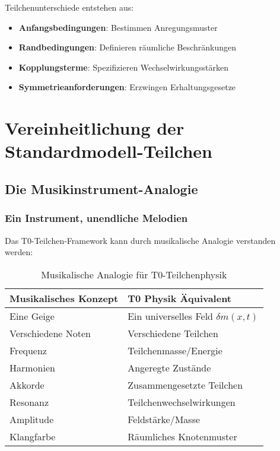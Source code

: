 \documentclass[12pt,a4paper]{article}
\newcommand{\deltafield}{\ensuremath{\delta m}}
\begin{document}
	Teilchenunterschiede entstehen aus:
	\begin{itemize}
		\item \textbf{Anfangsbedingungen}: Bestimmen Anregungsmuster
		\item \textbf{Randbedingungen}: Definieren räumliche Beschränkungen  
		\item \textbf{Kopplungsterme}: Spezifizieren Wechselwirkungsstärken
		\item \textbf{Symmetrieanforderungen}: Erzwingen Erhaltungsgesetze
	\end{itemize}
	
	\section{Vereinheitlichung der Standardmodell-Teilchen}
	\label{sec:sm_vereinheitlichung}
	
	\subsection{Die Musikinstrument-Analogie}
	\label{subsec:musikinstrument_analogie}
	
	\subsubsection{Ein Instrument, unendliche Melodien}
	\label{subsubsec:ein_instrument}
	
	Das T0-Teilchen-Framework kann durch musikalische Analogie verstanden werden:
	
	\begin{table}[htbp]
		\centering
		\begin{tabular}{ll}
			\toprule
			\textbf{Musikalisches Konzept} & \textbf{T0 Physik Äquivalent} \\
			\midrule
			Eine Geige & Ein universelles Feld $\deltafield(x,t)$ \\
			Verschiedene Noten & Verschiedene Teilchen \\
			Frequenz & Teilchenmasse/Energie \\
			Harmonien & Angeregte Zustände \\
			Akkorde & Zusammengesetzte Teilchen \\
			Resonanz & Teilchenwechselwirkungen \\
			Amplitude & Feldstärke/Masse \\
			Klangfarbe & Räumliches Knotenmuster \\
			\bottomrule
		\end{tabular}
		\caption{Musikalische Analogie für T0-Teilchenphysik}
		\label{tab:musikinstrument_analogie}
	\end{table}
	
\end{document}

